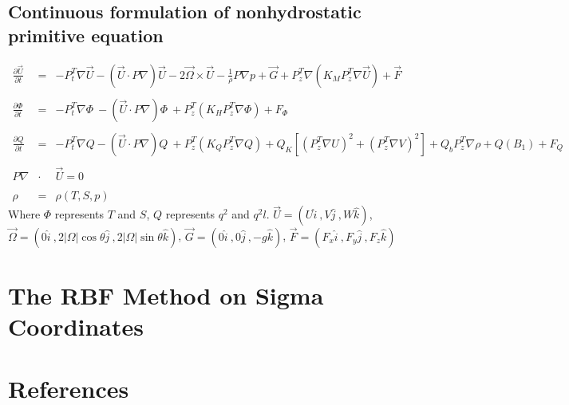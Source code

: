 \documentclass[oribibl]{llncs}
\begin{document}
\subsection{Continuous formulation of nonhydrostatic primitive equation}
\begin{eqnarray}
\frac{\partial {\vec{U}}}{\partial t} &=& -P^T_t \nabla {\vec{U}} - \left(\vec{U} \cdot P \nabla \right) \vec{U} - 2\vec{\Omega} \times \vec{U}-\frac{1}{\rho}P\nabla p+ \vec{G} + P^T_z \nabla \left( K_M P^T_z \nabla {\vec{U}} \right) + \vec{F} \\ \nonumber \\ 
\frac{\partial {\Phi}}{\partial t}    &=& -P^T_t \nabla \Phi \ - (\vec{U} \cdot P \nabla) \Phi \ + P^T_z \left(K_HP^T_z \nabla \Phi \right)+F_\Phi \\ \nonumber \\ 
\frac{\partial Q}{\partial t} &=& -P^T_t \nabla Q - \left(\vec{U} \cdot P \nabla \right) Q \ +  P^T_z \left(K_QP^T_z \nabla Q \right) + Q_K \left [(P^T_z\nabla U)^2+(P^T_z \nabla V)^2 \right] + Q_b P^T_z \nabla \rho +Q(B_1)  + F_Q \\ \nonumber \\ 
P\nabla  &\cdot  &\vec{U}=0  \\ \nonumber \\ 
\rho &=& \rho(T,S,p)
\end{eqnarray}
Where $\Phi$ represents $T$ and $S$, $Q$ represents $q^2$ and $q^2l$. $\vec{U}=(U \widehat{i} \ ,V \widehat{j} \ ,W \widehat{k})$, $\vec{\Omega}=(0 \widehat{i} \ ,2|\Omega|\cos{\theta} \widehat{j} \ ,2|\Omega| \sin{\theta} \widehat{k})$, $\vec{G}=(0 \widehat{i} \ ,0  \widehat{j} \ ,-g \widehat{k})$, $\vec{F}=(F_x \widehat{i} \ ,F_y \widehat{j} \ ,F_z \widehat{k})$

\section{The RBF Method on Sigma Coordinates}

\section{References}



 
\end{document}
